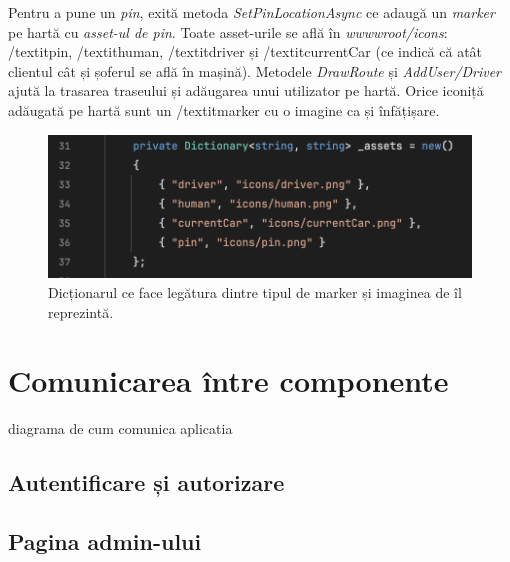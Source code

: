 Pentru a pune un \textit{pin}, exită metoda \textit{SetPinLocationAsync} ce adaugă un \textit{marker} pe hartă cu \textit{asset-ul de pin}.
Toate asset-urile se află în \textit{wwwwroot/icons}: /textit{pin}, /textit{human}, /textit{driver} și /textit{currentCar} (ce indică că atât clientul cât și șoferul se află în mașină).
Metodele \textit{DrawRoute} și \textit{AddUser/Driver} ajută la trasarea traseului și adăugarea unui utilizator pe hartă. Orice iconiță adăugată pe hartă
sunt un /textit{marker} cu o imagine ca și înfățișare.

\begin{figure}[H]
    \centering
    \includegraphics[width=14cm]{Assets/icons.png}
    \caption{Dicționarul ce face legătura dintre tipul de marker și imaginea de îl reprezintă.}
    \label{fig:icons}
\end{figure}

\section{Comunicarea între componente}
diagrama de cum comunica aplicatia
\subsection{Autentificare și autorizare}
\subsection{Pagina admin-ului}